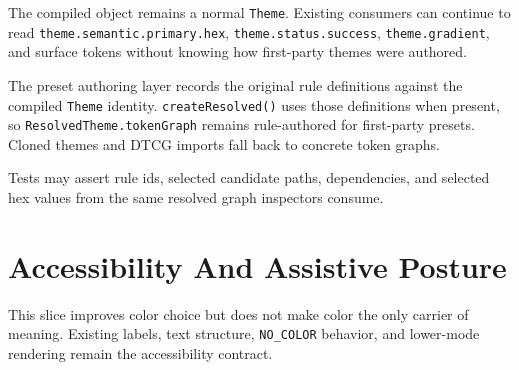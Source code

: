 The compiled object remains a normal \texttt{T\allowbreak{}h\allowbreak{}e\allowbreak{}m\allowbreak{}e}. Existing consumers can continue to read \texttt{t\allowbreak{}h\allowbreak{}e\allowbreak{}m\allowbreak{}e\allowbreak{}.\allowbreak{}s\allowbreak{}e\allowbreak{}m\allowbreak{}a\allowbreak{}n\allowbreak{}t\allowbreak{}i\allowbreak{}c\allowbreak{}.\allowbreak{}p\allowbreak{}r\allowbreak{}i\allowbreak{}m\allowbreak{}a\allowbreak{}r\allowbreak{}y\allowbreak{}.\allowbreak{}h\allowbreak{}e\allowbreak{}x}, \texttt{t\allowbreak{}h\allowbreak{}e\allowbreak{}m\allowbreak{}e\allowbreak{}.\allowbreak{}s\allowbreak{}t\allowbreak{}a\allowbreak{}t\allowbreak{}u\allowbreak{}s\allowbreak{}.\allowbreak{}s\allowbreak{}u\allowbreak{}c\allowbreak{}c\allowbreak{}e\allowbreak{}s\allowbreak{}s}, \texttt{t\allowbreak{}h\allowbreak{}e\allowbreak{}m\allowbreak{}e\allowbreak{}.\allowbreak{}g\allowbreak{}r\allowbreak{}a\allowbreak{}d\allowbreak{}i\allowbreak{}e\allowbreak{}n\allowbreak{}t}, and surface tokens without knowing how first-party themes were authored.

The preset authoring layer records the original rule definitions against the compiled \texttt{T\allowbreak{}h\allowbreak{}e\allowbreak{}m\allowbreak{}e} identity. \texttt{c\allowbreak{}r\allowbreak{}e\allowbreak{}a\allowbreak{}t\allowbreak{}e\allowbreak{}R\allowbreak{}e\allowbreak{}s\allowbreak{}o\allowbreak{}l\allowbreak{}v\allowbreak{}e\allowbreak{}d\allowbreak{}(\allowbreak{})} uses those definitions when present, so \texttt{R\allowbreak{}e\allowbreak{}s\allowbreak{}o\allowbreak{}l\allowbreak{}v\allowbreak{}e\allowbreak{}d\allowbreak{}T\allowbreak{}h\allowbreak{}e\allowbreak{}m\allowbreak{}e\allowbreak{}.\allowbreak{}t\allowbreak{}o\allowbreak{}k\allowbreak{}e\allowbreak{}n\allowbreak{}G\allowbreak{}r\allowbreak{}a\allowbreak{}p\allowbreak{}h} remains rule-authored for first-party presets. Cloned themes and DTCG imports fall back to concrete token graphs.

Tests may assert rule ids, selected candidate paths, dependencies, and selected hex values from the same resolved graph inspectors consume.

\section{Accessibility And Assistive Posture}\label{record-185-accessibility-and-assistive-posture}

This slice improves color choice but does not make color the only carrier of meaning. Existing labels, text structure, \texttt{N\allowbreak{}O\allowbreak{}\_\allowbreak{}C\allowbreak{}O\allowbreak{}L\allowbreak{}O\allowbreak{}R} behavior, and lower-mode rendering remain the accessibility contract.

